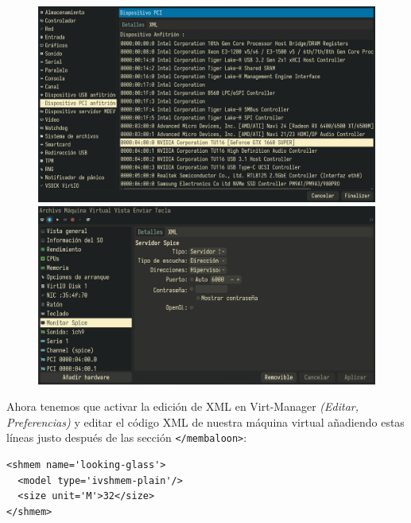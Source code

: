 \documentclass[11pt]{article}
\begin{document}
\begin{figure}[h!]
	\centering
	\begin{minipage}[b]{0.4965\textwidth}
		\includegraphics[height=0.6\textwidth,width=\textwidth]{images/card-add.jpg}
	\end{minipage}
	\begin{minipage}[b]{0.4965\textwidth}
		\includegraphics[height=0.6\textwidth,width=\textwidth]{images/spice-conf.jpg}
	\end{minipage}
\end{figure}

Ahora tenemos que activar la edición de XML en Virt-Manager \emph{(Editar, Preferencias)} y editar el código XML de nuestra máquina virtual añadiendo estas líneas justo después de las sección \texttt{</membaloon>}:

\begin{verbatim}
<shmem name='looking-glass'>
  <model type='ivshmem-plain'/>
  <size unit='M'>32</size>
</shmem>
\end{verbatim}
\end{document}
